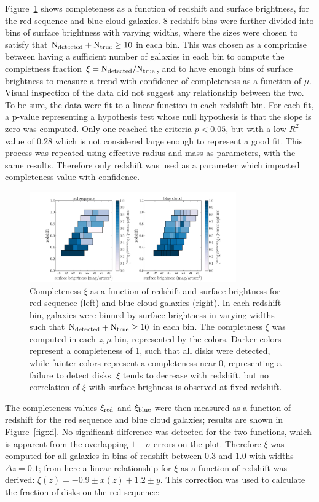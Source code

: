 \documentclass[useAMS,usenatbib]{mn2e}
\begin{document}
Figure~\ref{fig:xi_v_sb} shows completeness as a function of redshift and surface brightness, for the red sequence and blue cloud galaxies. 8 redshift bins were further divided into bins of surface brightness with varying widths, where the sizes were chosen to satisfy that $\rm N_{detected} + N_{true} \ge 10$ in each bin. This was chosen as a comprimise between having a sufficient number of galaxies in each bin to compute the completness fraction $\rm \xi = N_{detected}/N_{true}$, and to have enough bins of surface brightness to measure a trend with confidence of completeness as a function of $\mu$. Visual inspection of the data did not suggest any relationship between the two. To be sure, the data were fit to a linear function in each redshift bin. For each fit, a p-value representing a hypothesis test whose null hypothesis is that the slope is zero was computed. Only one reached the criteria $p<0.05$, but with a low $R^{2}$ value of 0.28 which is not considered large enough to represent a good fit. This process was repeated using effective radius and mass as parameters, with the same results. Therefore only redshift was used as a parameter which impacted completeness value with confidence. 

\begin{figure}
\centering
\includegraphics[width=3.5in,trim={3cm 0cm 3cm 0cm},clip]{figures/xi_v_sb.pdf}
\caption{Completeness $\xi$ as a function of redshift and surface brightness for red sequence (left) and blue cloud galaxies (right). In each redshift bin, galaxies were binned by surface brightness in varying widths such that $\rm N_{detected} + N_{true} \ge 10$ in each bin. The completness $\xi$ was computed in each $z,\mu$ bin, represented by the colors. Darker colors represent a completeness of 1, such that all disks were detected, while fainter colors represent a completeness near 0, representing a failure to detect disks. $\xi$ tends to decrease with redshift, but no correlation of $\xi$ with surface brighness is observed at fixed redshift.}
\label{fig:xi_v_sb}
\end{figure}


The completeness values $\rm \xi_{red}$ and $\rm \xi_{blue}$ were then measured as a function of redshift for the red sequence and blue cloud  galaxies; results are shown in Figure~\ref{fig:xi}. No significant difference was detected for the two functions, which is apparent from the overlapping $1-\sigma$ errors on the plot. Therefore $\xi$ was computed for all galaxies in bins of redshift between 0.3 and 1.0 with widths $\Delta z = 0.1$; from here a linear relationship for $\xi$ as a function of redshift was derived: $\xi(z) = -0.9 \pm x (z) + 1.2 \pm y$. This correction was used to calculate the fraction of disks on the red sequence:
\end{document}
